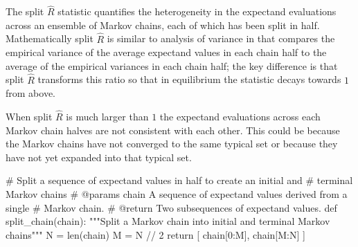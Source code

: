 \documentclass[
  letterpaper,
  DIV=11,
  numbers=noendperiod]{scrartcl}
\newenvironment{Shaded}{\begin{snugshade}}{\end{snugshade}}
\newcommand{\BuiltInTok}[1]{\textcolor[rgb]{0.00,0.23,0.31}{#1}}
\newcommand{\CommentTok}[1]{\textcolor[rgb]{0.37,0.37,0.37}{#1}}
\newcommand{\ControlFlowTok}[1]{\textcolor[rgb]{0.00,0.23,0.31}{#1}}
\newcommand{\DecValTok}[1]{\textcolor[rgb]{0.68,0.00,0.00}{#1}}
\newcommand{\KeywordTok}[1]{\textcolor[rgb]{0.00,0.23,0.31}{#1}}
\newcommand{\NormalTok}[1]{\textcolor[rgb]{0.00,0.23,0.31}{#1}}
\newcommand{\OperatorTok}[1]{\textcolor[rgb]{0.37,0.37,0.37}{#1}}
\begin{document}
The split \(\hat{R}\) statistic quantifies the heterogeneity in the
expectand evaluations across an ensemble of Markov chains, each of which
has been split in half. Mathematically split \(\hat{R}\) is similar to
analysis of variance in that compares the empirical variance of the
average expectand values in each chain half to the average of the
empirical variances in each chain half; the key difference is that split
\(\hat{R}\) transforms this ratio so that in equilibrium the statistic
decays towards \(1\) from above.

When split \(\hat{R}\) is much larger than \(1\) the expectand
evaluations across each Markov chain halves are not consistent with each
other. This could be because the Markov chains have not converged to the
same typical set or because they have not yet expanded into that typical
set.

\begin{Shaded}
\begin{Highlighting}[]
\CommentTok{\# Split a sequence of expectand values in half to create an initial and }
\CommentTok{\# terminal Markov chains}
\CommentTok{\# @params chain A sequence of expectand values derived from a single }
\CommentTok{\#               Markov chain.}
\CommentTok{\# @return Two subsequences of expectand values.}
\KeywordTok{def}\NormalTok{ split\_chain(chain):}
  \CommentTok{"""Split a Markov chain into initial and terminal Markov chains"""}
\NormalTok{  N }\OperatorTok{=} \BuiltInTok{len}\NormalTok{(chain)}
\NormalTok{  M }\OperatorTok{=}\NormalTok{ N }\OperatorTok{//} \DecValTok{2}
  \ControlFlowTok{return}\NormalTok{ [ chain[}\DecValTok{0}\NormalTok{:M], chain[M:N] ]}
\end{Highlighting}
\end{Shaded}
\end{document}
